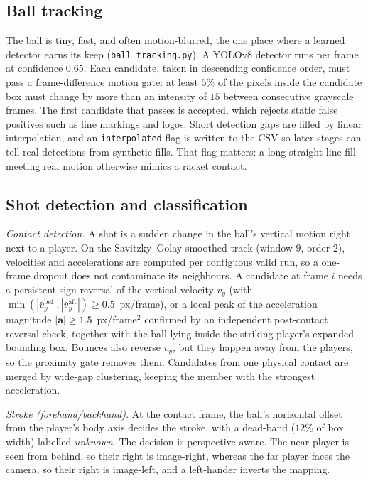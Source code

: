 \documentclass[11pt]{article}
\begin{document}
\subsection{Ball tracking}
The ball is tiny, fast, and often motion-blurred, the one place where a learned detector earns its keep (\texttt{ball\_tracking.py}). A YOLOv8 detector runs per frame at confidence $0.65$. Each candidate, taken in descending confidence order, must pass a frame-difference motion gate: at least $5\%$ of the pixels inside the candidate box must change by more than an intensity of $15$ between consecutive grayscale frames. The first candidate that passes is accepted, which rejects static false positives such as line markings and logos. Short detection gaps are filled by linear interpolation, and an \texttt{interpolated} flag is written to the CSV so later stages can tell real detections from synthetic fills. That flag matters: a long straight-line fill meeting real motion otherwise mimics a racket contact.

\subsection{Shot detection and classification}
\textit{Contact detection.} A shot is a sudden change in the ball's vertical motion right next to a player. On the Savitzky--Golay-smoothed track (window $9$, order $2$), velocities and accelerations are computed per contiguous valid run, so a one-frame dropout does not contaminate its neighbours. A candidate at frame $i$ needs a persistent sign reversal of the vertical velocity $v_y$ (with $\min(|\bar v_y^{\text{bef}}|,|\bar v_y^{\text{aft}}|)\ge 0.5$~px/frame), or a local peak of the acceleration magnitude $|\mathbf{a}|\ge 1.5$~px/frame$^2$ confirmed by an independent post-contact reversal check, together with the ball lying inside the striking player's expanded bounding box. Bounces also reverse $v_y$, but they happen away from the players, so the proximity gate removes them. Candidates from one physical contact are merged by wide-gap clustering, keeping the member with the strongest acceleration.

\textit{Stroke (forehand/backhand).} At the contact frame, the ball's horizontal offset from the player's body axis decides the stroke, with a dead-band ($12\%$ of box width) labelled \emph{unknown}. The decision is perspective-aware. The near player is seen from behind, so their right is image-right, whereas the far player faces the camera, so their right is image-left, and a left-hander inverts the mapping.
\end{document}
